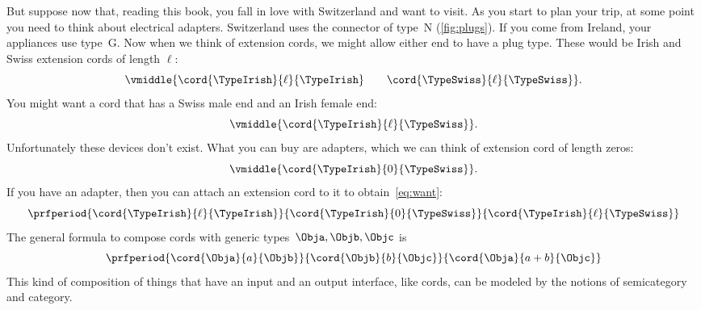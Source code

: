But suppose now that, reading this book, you fall in love with Switzerland and want to visit.
As you start to plan your trip, at some point you need to think about electrical adapters.
Switzerland uses the connector of type~N (\cref{fig:plugs}).
If you come from Ireland, your appliances use type~G.
Now when we think of extension cords, we might allow either end to have a plug type.
%
These would be Irish and Swiss extension cords of length $\ell$:
%
\begin{equation}
    \label{eq:irish-swiss}
    \vmiddle{\cord{\TypeIrish}{\ell}{\TypeIrish} \qquad \cord{\TypeSwiss}{\ell}{\TypeSwiss}}.
\end{equation}
%
You might want a cord that has a Swiss male end and an Irish female end:
%
\begin{equation}
    \label{eq:want}
    \vmiddle{\cord{\TypeIrish}{\ell}{\TypeSwiss}}.
\end{equation}
%
Unfortunately these devices don't exist.
What you can buy are adapters, which we can think of extension cord of length zeros:
\begin{equation}
    \vmiddle{\cord{\TypeIrish}{0}{\TypeSwiss}}.
\end{equation}
%
If you have an adapter, then you can attach an extension cord to it to obtain~\cref{eq:want}:
%
\begin{equation}
    \label{eq:irish-swiss-result}
    \prfperiod{
        \cord{\TypeIrish}{\ell}{\TypeIrish}
    }{
        \cord{\TypeIrish}{0}{\TypeSwiss}
    }{
        \cord{\TypeIrish}{\ell}{\TypeSwiss}
    }
\end{equation}
%
The general formula to compose cords with generic types~$\Obja, \Objb, \Objc$ is
%
\begin{equation}
    \label{eq:cords-generic}
    \prfperiod{
        \cord{\Obja}{a}{\Objb}
    }{
        \cord{\Objb}{b}{\Objc}
    }{
        \cord{\Obja}{a+b}{\Objc}
    }
\end{equation}
%
This kind of composition of things that have an input and an output interface, like cords, can be modeled by the notions of semicategory and category.


%
%
%

